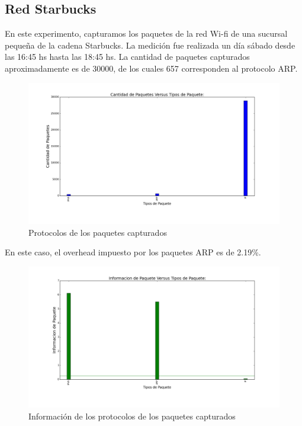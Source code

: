 \subsection{Red Starbucks}

En este experimento, capturamos los paquetes de la red Wi-fi de una sucursal pequeña de la cadena Starbucks. La medición fue realizada un día sábado desde las 16:45 hs hasta las 18:45 hs. La cantidad de paquetes capturados aproximadamente es de 30000, de los cuales 657 corresponden al protocolo ARP.

\begin{figure}[H]
       \centering
       \includegraphics[width=1\textwidth]{../resultados/Starbucks/histogram_types.png}
       \caption{Protocolos de los paquetes capturados}
       \label{red-Starbucks-types}
\end{figure}

En este caso, el overhead impuesto por los paquetes ARP es de 2.19\%.

\begin{figure}[H]
       \centering
       \includegraphics[width=1\textwidth]{../resultados/Starbucks/histogram_types_information.png}
       \caption{Información de los protocolos de los paquetes capturados}
       \label{red-Starbucks-types-information}
\end{figure}

